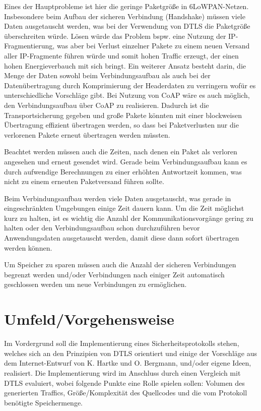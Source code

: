 \documentclass[a4paper,10pt]{report}
\begin{document}
Eines der Hauptprobleme ist hier die geringe Paketgröße in 6LoWPAN-Netzen. Insbesondere beim Aufbau der sicheren Verbindung (Handshake) müssen
viele Daten ausgetauscht werden, was bei der Verwendung von DTLS die Paketgröße überschreiten würde. Lösen würde das Problem bspw. eine Nutzung der
IP-Fragmentierung, was aber bei Verlust einzelner Pakete zu einem neuen Versand aller IP-Fragmente führen würde und somit hohen Traffic erzeugt,
der einen hohen Energieverbauch mit sich bringt. Ein weiterer Ansatz besteht darin, die Menge der Daten sowohl beim Verbindungsaufbau als auch
bei der Datenübertragung durch Komprimierung der Headerdaten zu verringern wofür es unterschiedliche Vorschläge gibt. Bei Nutzung von CoAP wäre
es auch möglich, den Verbindungsaufbau über CoAP zu realisieren. Dadurch ist die Transportsicherung gegeben und große Pakete könnten mit einer
blockweisen Übertragung effizient übertragen werden, so dass bei Paketverlusten nur die verlorenen Pakete erneut übertragen werden müssten.

Beachtet werden müssen auch die Zeiten, nach denen ein Paket als verloren angesehen und erneut gesendet wird. Gerade beim Verbindungsaufbau
kann es durch aufwendige Berechnungen zu einer erhöhten Antwortzeit kommen, was nicht zu einem erneuten Paketversand führen sollte.

Beim Verbindungsaufbau werden viele Daten ausgetauscht, was gerade in eingeschränkten Umgebungen einige Zeit dauern kann. Um die Zeit
möglichst kurz zu halten, ist es wichtig die Anzahl der Kommunikationsvorgänge gering zu halten oder den Verbindungsaufbau schon durchzuführen
bevor Anwendungsdaten ausgetauscht werden, damit diese dann sofort übertragen werden können.

Um Speicher zu sparen müssen auch die Anzahl der sicheren Verbindungen begrenzt werden und/oder Verbindungen nach einiger Zeit
automatisch geschlossen werden um neue Verbindungen zu ermöglichen.

\section{Umfeld/Vorgehensweise}
Im Vordergrund soll die Implementierung eines Sicherheitsprotokolls stehen, welches sich an den Prinzipien von DTLS orientiert
und einige der Vorschläge aus dem Internet-Entwurf von K. Hartke und O. Bergmann, und/oder eigene Ideen, realisiert.
Die Implementierung wird im Anschluss durch einen Vergleich mit DTLS evaluiert, wobei folgende Punkte eine Rolle spielen sollen:
Volumen des generierten Traffics, Größe/Komplexität des Quellcodes und die vom Protokoll benötigte Speichermenge.
\end{document}
